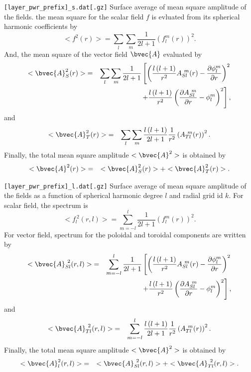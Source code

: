 %
\begin{description}
\item{\tt [layer\_pwr\_prefix]\_s.dat[.gz]} Surface average of mean square amplitude of the fields. the mean square for the scalar field $f$ is evluated from its spherical harmonic coefficients by
%
\begin{equation}
<f^{2}(r)> = \sum_{l}\sum_{m}  \frac{1}{2l + 1} \left(f_{l}^{m}(r) \right)^2.
\end{equation}
%
And, the mean square of the vector field $\bvec{A}$ evaluated by
%
\begin{eqnarray}
<\bvec{A}_{S}^{2}(r)> &=& \sum_{l}\sum_{m} \frac{1}{2l + 1}
\left[  \left(\frac{l\left(l+1 \right) }{r^{2}} A_{Sl}^{\ m}(r) - \frac{\partial \phi_{l}^{m}}{\partial r} \right)^{2} 
\right. \nonumber \\
& & \left. +  \frac{l \left( l+1 \right)}{r^{2}} \left( \frac{\partial A_{Sl}^{\ m}}{\partial r} - \phi_{l}^{m} \right)^{2} \right],
\end{eqnarray}
%
and
%
\begin{eqnarray}
<\bvec{A}_{T}^{2}(r)> &=& \sum_{l}\sum_{m} \frac{l \left( l+1 \right)}{2l + 1} \frac{1}{r^{2}} \left( A_{Tl}^{\ m}(r) \right)^{2}.
\end{eqnarray}
Finally, the total mean square amplitude $<\bvec{A}^{2}> $ is obtained by
\begin{eqnarray}
<\bvec{A}^{2}(r)> &=& <\bvec{A}_{S}^{2}(r)>  + <\bvec{A}_{T}^{2}(r)> .
\end{eqnarray}
%
%
\item{\tt [layer\_pwr\_prefix]\_l.dat[.gz]} Surface average of mean square amplitude of the fields as a function of spherical harmonic degree $l$ and radial grid id $k$. For scalar field, the spectrum is
%
\begin{equation}
< f_{l}^{\ 2}(r,l)>  = \sum_{m=-l}^{l}  \frac{1}{2l + 1} \left(f_{l}^{m}(r) \right)^2.
\end{equation}
%
For vector field, spectrum for the poloidal and toroidal components are written by 
%
\begin{eqnarray}
<\bvec{A}_{Sl}^{\ 2}(r,l)> &=&  \sum_{m=-l}^{l}  \frac{1}{2l + 1}
\left[  \left(\frac{l\left(l+1 \right) }{r^{2}} A_{Sl}^{\ m}(r) - \frac{\partial \phi_{l}^{m}}{\partial r} \right)^{2} 
\right. \nonumber \\
& & \left. +  \frac{l \left( l+1 \right)}{r^{2}} \left( \frac{\partial A_{Sl}^{\ m}}{\partial r} - \phi_{l}^{m} \right)^{2} \right],
\end{eqnarray}
%
and
\begin{eqnarray}
<\bvec{A}_{Tl}^{\ 2}(r,l)>  &=& \sum_{m=-l}^{l} \frac{l \left( l+1 \right)}{2l + 1} \frac{1}{r^{2}} \left( A_{Tl}^{\ m}(r) \right)^{2}.
\end{eqnarray}
Finally, the total mean square amplitude $<\bvec{A}^{2}> $ is obtained by
\begin{eqnarray}
<\bvec{A}_{l}^{2}(r,l)> &=& <\bvec{A}_{Sl}^{\ 2}(r,l)>  + <\bvec{A}_{Tl}^{\ 2}(r,l)> .
\end{eqnarray}


\end{description}
